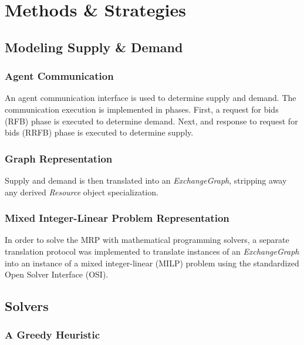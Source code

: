 \section{Methods \& Strategies}

\subsection{Modeling Supply \& Demand}

\subsubsection{Agent Communication}

An agent communication interface is used to determine supply and demand. The
communication execution is implemented in phases. First, a request for bids
(RFB) phase is executed to determine demand. Next, and response to request for
bids (RRFB) phase is executed to determine supply.


\subsubsection{Graph Representation}

Supply and demand is then translated into an \textit{ExchangeGraph}, stripping
away any derived \textit{Resource} object specialization. 


\subsubsection{Mixed Integer-Linear Problem Representation}

In order to solve the MRP with mathematical programming solvers, a separate
translation protocol was implemented to translate instances of an
\textit{ExchangeGraph} into an instance of a mixed integer-linear (MILP) problem
using the standardized Open Solver Interface (OSI). %

\subsection{Solvers}

\subsubsection{A Greedy Heuristic}

